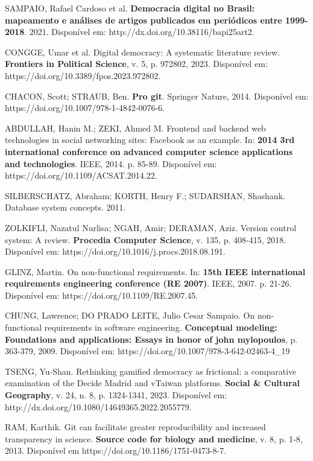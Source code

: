  SAMPAIO, Rafael Cardoso et al. \textbf{Democracia digital no Brasil: mapeamento e análises de artigos publicados em periódicos entre 1999-2018}. 2021. Disponível em: http://dx.doi.org/10.38116/bapi25art2.

 CONGGE, Umar et al. Digital democracy: A systematic literature review. \textbf{Frontiers in Political Science}, v. 5, p. 972802, 2023. Disponível em: https://doi.org/10.3389/fpos.2023.972802.

 CHACON, Scott; STRAUB, Ben. \textbf{Pro git}. Springer Nature, 2014. Disponível em: https://doi.org/10.1007/978-1-4842-0076-6.

 ABDULLAH, Hanin M.; ZEKI, Ahmed M. Frontend and backend web technologies in social networking sites: Facebook as an example. In: \textbf{2014 3rd international conference on advanced computer science applications and technologies}. IEEE, 2014. p. 85-89. Disponível em: https://doi.org/10.1109/ACSAT.2014.22.

 SILBERSCHATZ, Abraham; KORTH, Henry F.; SUDARSHAN, Shashank. Database system concepts. 2011.

 ZOLKIFLI, Nazatul Nurlisa; NGAH, Amir; DERAMAN, Aziz. Version control system: A review. \textbf{Procedia Computer Science}, v. 135, p. 408-415, 2018. Disponível em: https://doi.org/10.1016/j.procs.2018.08.191.

 GLINZ, Martin. On non-functional requirements. In: \textbf{15th IEEE international requirements engineering conference (RE 2007)}. IEEE, 2007. p. 21-26. Disponível em: https://doi.org/10.1109/RE.2007.45.

 CHUNG, Lawrence; DO PRADO LEITE, Julio Cesar Sampaio. On non-functional requirements in software engineering. \textbf{Conceptual modeling: Foundations and applications: Essays in honor of john mylopoulos}, p. 363-379, 2009. Disponível em: https://doi.org/10.1007/978-3-642-02463-4\_19

 TSENG, Yu-Shan. Rethinking gamified democracy as frictional: a comparative examination of the Decide Madrid and vTaiwan platforms. \textbf{Social \& Cultural Geography}, v. 24, n. 8, p. 1324-1341, 2023. Disponível em: http://dx.doi.org/10.1080/14649365.2022.2055779.

 RAM, Karthik. Git can facilitate greater reproducibility and increased transparency in science. \textbf{Source code for biology and medicine}, v. 8, p. 1-8, 2013. Disponível em https://doi.org/10.1186/1751-0473-8-7.

